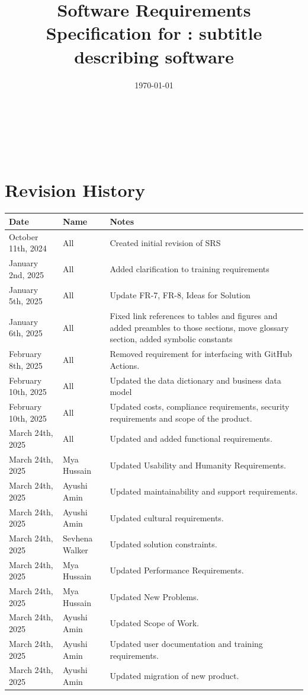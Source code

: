 \documentclass[12pt]{article}
\begin{document}

\title{Software Requirements Specification for \progname: subtitle
describing software}
\author{\authname}
\date{\today}

\maketitle
\thispagestyle{empty}

~\newpage

\tableofcontents

~\newpage

\section*{Revision History}

\begin{tabularx}{\textwidth}{p{3.7cm}>{\raggedright\arraybackslash}p{1.8cm}X}
  \toprule {\textbf{Date}} & {\textbf{Name}} & {\textbf{Notes}}\\
  \midrule
  October 11th, 2024 & All & Created initial revision of SRS\\
  January 2nd, 2025 & All & Added clarification to training requirements\\
  January 5th, 2025 & All & Update FR-7, FR-8, Ideas for Solution \\
  January 6th, 2025 & All & Fixed link references to tables and
  figures and added preambles to those sections, move glossary
  section, added symbolic constants\\
  February 8th, 2025 & All & Removed requirement for interfacing with
  GitHub Actions.\\
  February 10th, 2025 & All & Updated the data dictionary and
  business data model \\
  February 10th, 2025 & All & Updated costs, compliance requirements,
  security requirements and scope of the product. \\
  March 24th, 2025 & All & Updated and added functional requirements. \\
  March 24th, 2025 & Mya Hussain & Updated Usability and Humanity Requirements. \\
  March 24th, 2025 & Ayushi Amin & Updated maintainability and support requirements. \\
  March 24th, 2025 & Ayushi Amin & Updated cultural requirements. \\
  March 24th, 2025 & Sevhena Walker & Updated solution constraints. \\
  March 24th, 2025 & Mya Hussain & Updated Performance Requirements. \\
  March 24th, 2025 & Mya Hussain & Updated New Problems. \\
  March 24th, 2025 & Ayushi Amin & Updated Scope of Work. \\
  March 24th, 2025 & Ayushi Amin & Updated user documentation and training requirements. \\
  March 24th, 2025 & Ayushi Amin & Updated migration of new product. \\
  \bottomrule 
\end{tabularx}
\end{document}
